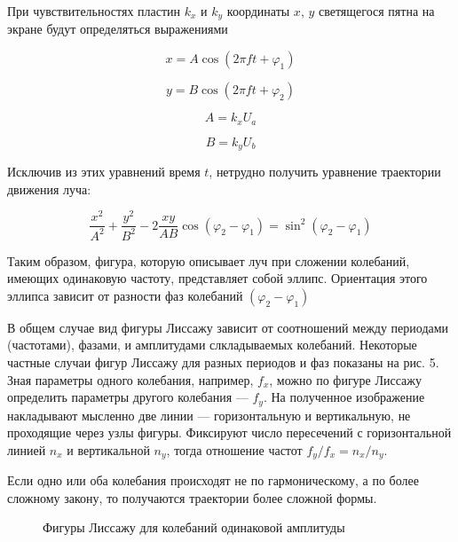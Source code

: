 \documentclass[14pt]{article}
\begin{document}
При чувствительностях пластин $k_x$ и $k_y$ координаты $x$, $y$ светящегося пятна на экране будут определяться выражениями

$$x = A\cos (2\pi ft + \varphi_1)$$

$$y = B\cos (2\pi ft + \varphi_2)$$

$$A = k_xU_a$$

$$B = k_yU_b$$

Исключив из этих уравнений время $t$, нетрудно получить уравнение траектории движения луча:

$$\frac{x^2}{A^2} + \frac{y^2}{B^2} - 2\frac{xy}{AB}\cos (\varphi_2 - \varphi_1) = 
  \sin^2 (\varphi_2 - \varphi_1)$$

Таким образом, фигура, которую описывает луч при сложении колебаний, имеющих одинаковую частоту, представляет собой эллипс. Ориентация этого эллипса зависит от разности фаз колебаний $(\varphi_2 - \varphi_1)$

В общем случае вид фигуры Лиссажу зависит от соотношений между периодами (частотами), фазами, и амплитудами слкладываемых колебаний. Некоторые частные случаи фигур Лиссажу для разных периодов и фаз показаны на рис. 5. Зная параметры одного колебания, например, $f_x$, можно по фигуре Лиссажу определить параметры другого колебания --- $f_y$. На полученное изображение накладывают мысленно две линии --- горизонтальную и вертикальную, не проходящие через узлы фигуры. Фиксируют число пересечений с горизонтальной линией $n_x$ и вертикальной $n_y$, тогда отношение частот $f_y/f_x = n_x/n_y$.

Если одно или оба колебания происходят не по гармоническому, а по более сложному закону, то получаются траектории более сложной формы. 

\begin{figure}[h!]
	\caption{Фигуры Лиссажу для колебаний одинаковой амплитуды}
	\label{fig:image}
\end{figure}
\end{document}
